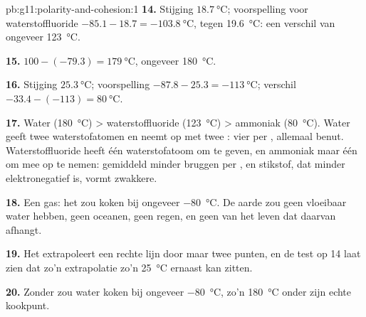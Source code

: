 \begin{solution}{pb:g11:polarity-and-cohesion:1}
\textbf{14.} Stijging $\qty{18.7}{\celsius}$; voorspelling voor
waterstoffluoride $-85.1 - 18.7 = \qty{-103.8}{\celsius}$, tegen
\qty{19.6}{\celsius}: een verschil van ongeveer \qty{123}{\celsius}.

\textbf{15.} $100 - (-79.3) = \qty{179}{\celsius}$, ongeveer
\qty{180}{\celsius}.

\textbf{16.} Stijging $\qty{25.3}{\celsius}$; voorspelling $-87.8 - 25.3 =
\qty{-113}{\celsius}$; verschil $-33.4 - (-113) = \qty{80}{\celsius}$.

\textbf{17.} Water (\qty{180}{\celsius}) > waterstoffluoride
(\qty{123}{\celsius}) > ammoniak (\qty{80}{\celsius}). Water geeft twee
waterstofatomen en neemt op met twee : vier
 per , allemaal benut. Waterstoffluoride heeft
één waterstofatoom om te geven, en ammoniak maar één 
om mee op te nemen: gemiddeld minder bruggen per , en stikstof,
dat minder elektronegatief is, vormt zwakkere.

\textbf{18.} Een gas: het zou koken bij ongeveer \qty{-80}{\celsius}. De
aarde zou geen vloeibaar water hebben, geen oceanen, geen regen, en geen
van het leven dat daarvan afhangt.

\textbf{19.} Het extrapoleert een rechte lijn door maar twee punten, en de
test op  14 laat zien dat zo'n extrapolatie zo'n
\qty{25}{\celsius} ernaast kan zitten.

\textbf{20.} Zonder  zou water koken bij ongeveer
\qty{-80}{\celsius}, zo'n \qty{180}{\celsius} onder zijn echte kookpunt.
\end{solution}
